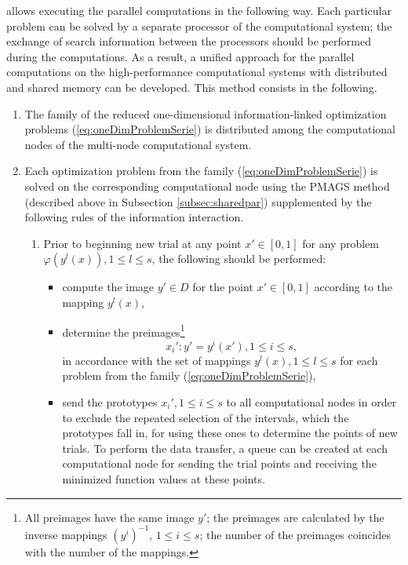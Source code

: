 \documentclass{aims}
\theoremstyle{definition}
\begin{document}
allows executing the parallel computations in the following way. Each particular
problem can be solved by a separate processor of the computational system; the exchange
of search information between the processors should be performed during the computations.
As a result, a unified approach for the parallel computations on the high-performance
computational systems with distributed and shared memory can be developed. This method consists in the following.
\begin{enumerate}
  \item The family of the reduced one-dimensional information-linked optimization
  problems (\ref{eq:oneDimProblemSerie}) is distributed among the computational nodes of the multi-node computational system.
  \item Each optimization problem from the family (\ref{eq:oneDimProblemSerie}) is solved on the
  corresponding computational node using the PMAGS method (described above in Subsection \ref{subsec:sharedpar})
  supplemented by the following rules of the information interaction.
  \begin{enumerate}
    \item Prior to beginning new trial at any point \(x'\in [0,1]\) for any problem \(\varphi(y^l(x)),1\leq l\leq s\), the following should be performed:
    \begin{itemize}
      \item compute the image \(y'\in D\) for the point \(x'\in [0, 1]\) according to the mapping \(y^l(x)\),
      \item determine  the preimages\footnote{All preimages have the same
      image \(y'\); the preimages are calculated by the inverse mappings \((y^i)^{-1}\), \(1\le i\le s\);
      the number of the preimages coincides with the number of the mappings.}
      \begin{displaymath}
        x_i':y'=y^i(x'),1\le i\le s,
      \end{displaymath}
      in accordance with the set of mappings \(y^l(x), 1\le l\le s\) for each problem from the family (\ref{eq:oneDimProblemSerie}),
      \item send the prototypes \(x_i',1\leq i\leq s\) to all computational nodes in order
      to exclude the repeated selection of the intervals, which the prototypes fall in,
      for using these ones to determine the points of new trials. To perform the data transfer,
      a queue can be created at each computational node for sending the trial points and
      receiving the minimized function values at these points.

\end{itemize}
\end{enumerate}
\end{enumerate}
\end{document}
